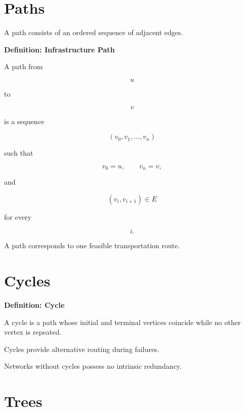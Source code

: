 \documentclass[11pt,fleqn]{book}
\numberwithin{equation}{chapter}
\newenvironment{definition}[1]
  {\begin{definitionEnv}
   \noindent\textbf{Definition: #1}\par\smallskip}
  {\end{definitionEnv}}
\theoremstyle{plain}
\theoremstyle{definition}
\theoremstyle{remark}
\begin{document}
\section{Paths}

A path consists of an ordered sequence of adjacent edges.


\begin{definition}{Infrastructure Path}

A path from

\[
u
\]

to

\[
v
\]

is a sequence

\[
(v_0,v_1,\ldots,v_n)
\]

such that

\[
v_0=u,
\qquad
v_n=v,
\]

and

\[
(v_i,v_{i+1})\in E
\]

for every

\[
i.
\]

\end{definition}


A path corresponds to one feasible transportation route.


\section{Cycles}


\begin{definition}{Cycle}

A cycle is a path whose initial and terminal vertices coincide while no
other vertex is repeated.

\end{definition}

Cycles provide alternative routing during failures.

Networks without cycles possess no intrinsic redundancy.


\section{Trees}
\end{document}
